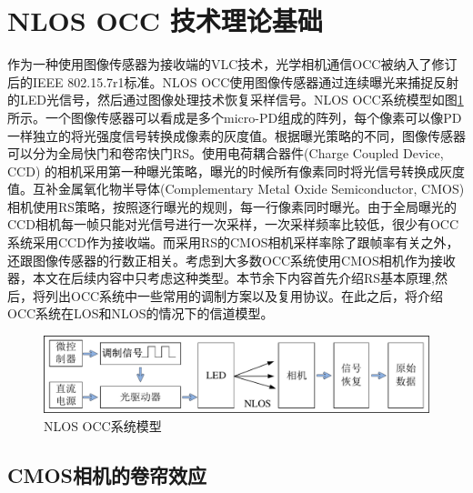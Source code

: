 \section{NLOS OCC 技术理论基础}
作为一种使用图像传感器为接收端的VLC技术，光学相机通信OCC被纳入了修订后的IEEE 802.15.7r1标准。NLOS OCC使用图像传感器通过连续曝光来捕捉反射的LED光信号，然后通过图像处理技术恢复采样信号。NLOS OCC系统模型如图\ref{fig:OCC model}所示。一个图像传感器可以看成是多个micro-PD组成的阵列，每个像素可以像PD一样独立的将光强度信号转换成像素的灰度值。根据曝光策略的不同，图像传感器可以分为全局快门和卷帘快门RS。使用电荷耦合器件(Charge Coupled Device, CCD) 的相机采用第一种曝光策略，曝光的时候所有像素同时将光信号转换成灰度值。互补金属氧化物半导体(Complementary Metal Oxide Semiconductor, CMOS)相机使用RS策略，按照逐行曝光的规则，每一行像素同时曝光。由于全局曝光的CCD相机每一帧只能对光信号进行一次采样，一次采样频率比较低，很少有OCC系统采用CCD作为接收端。而采用RS的CMOS相机采样率除了跟帧率有关之外，还跟图像传感器的行数正相关。考虑到大多数OCC系统使用CMOS相机作为接收器，本文在后续内容中只考虑这种类型。本节余下内容首先介绍RS基本原理,然后，将列出OCC系统中一些常用的调制方案以及复用协议。在此之后，将介绍OCC系统在LOS和NLOS的情况下的信道模型。
\begin{figure}[!htbp]
  \centering
  \includegraphics[width=\linewidth]{FIG/OCC modell.pdf}
  \caption{NLOS OCC系统模型}
  \label{fig:OCC model}
\end{figure}



\subsection{CMOS相机的卷帘效应}

